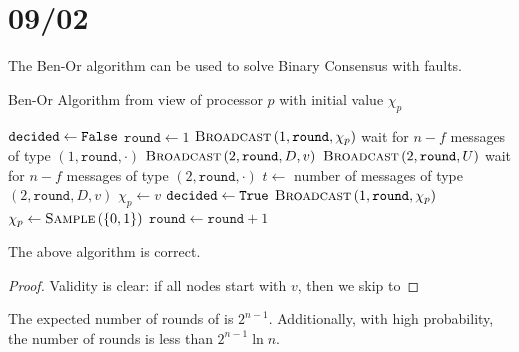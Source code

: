 \section{09/02}
The Ben-Or algorithm can be used to solve Binary Consensus with faults.
\begin{algorithm}
    \caption[]{Ben-Or Algorithm from view of processor $p$ with initial value $\chi_p$}
    \label{alg:ben-or}
    \begin{algorithmic}[1]
            \State $\texttt{decided} \gets \texttt{False}$
            \State $\texttt{round} \gets 1$
                \State $\Call{Broadcast}{1, \texttt{round}, \chi_p}$
                \State wait for $n - f$ messages of type $(1, \texttt{round}, \cdot)$
                    \State $\Call{Broadcast}{2, \texttt{round}, D, v}$
                \Else
                    \State $\Call{Broadcast}{2, \texttt{round}, U}$
                \EndIf
                \State wait for $n - f$ messages of type $(2, \texttt{round}, \cdot)$
                \State $t \gets$ number of messages of type $(2, \texttt{round}, D, v)$
                    \State $\chi_p \gets v$
                        \State $\texttt{decided} \gets \texttt{True}$
                        \State $\Call{Broadcast}{1, \texttt{round}, \chi_p}$
                    \EndIf
                \Else {}
                    \State $\chi_p \gets \Call{Sample}{\set{0,1}}$
                \EndIf
                \State $\texttt{round} \gets \texttt{round} + 1$
            \EndWhile
        \EndProcedure
    \end{algorithmic}
\end{algorithm}
\begin{theorem}{}{}
    The above algorithm is correct.
\end{theorem}

\begin{proof}
    Validity is clear: if all nodes start with $v$, then we skip to 
\end{proof}

\begin{theorem}{}{}
    The expected number of rounds of  is $2^{n-1}$.
    Additionally, with high probability, the number of rounds is less than
    $2^{n-1}\ln{n}$.
\end{theorem}

